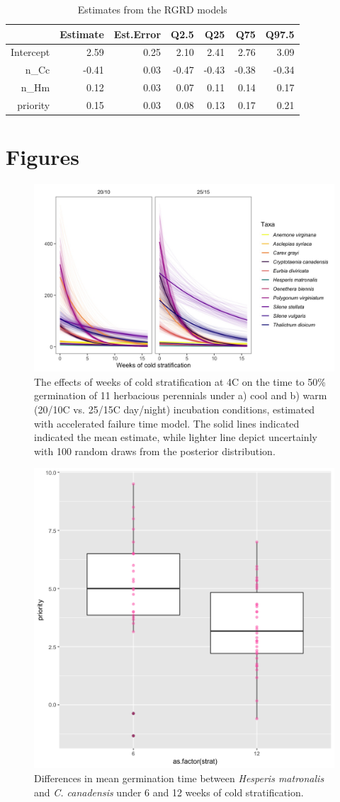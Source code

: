 \documentclass{article}\usepackage[]{graphicx}\usepackage[]{color}
\begin{document}
\begin{table}[ht]
\centering
\begin{tabular}{rrrrrrr}
  \hline
 & Estimate & Est.Error & Q2.5 & Q25 & Q75 & Q97.5 \\ 
  \hline
Intercept & 2.59 & 0.25 & 2.10 & 2.41 & 2.76 & 3.09 \\ 
  n\_Cc & -0.41 & 0.03 & -0.47 & -0.43 & -0.38 & -0.34 \\ 
  n\_Hm & 0.12 & 0.03 & 0.07 & 0.11 & 0.14 & 0.17 \\ 
  priority & 0.15 & 0.03 & 0.08 & 0.13 & 0.17 & 0.21 \\ 
   \hline
\end{tabular}
\caption{Estimates from the RGRD models}
\label{tab:RGRD}
\end{table}

\pagebreak


\section*{Figures}
\begin{figure}[h!]
    \centering
\includegraphics[width=\textwidth]{..//figure/AFTall.jpeg}
   \caption{The effects of weeks of cold stratification at 4\degree C on the time to 50\% germination of 11 herbacious perennials under a) cool and b) warm (20/10\degree C vs. 25/15\degree C day/night) incubation conditions, estimated with accelerated failure time model. The solid lines indicated indicated the mean estimate, while lighter line depict uncertainly with 100 random draws from the posterior distribution.} 
   \label{fig:AFTall}
\end{figure}


\begin{figure}[h!]
    \centering
\includegraphics[width=.5\textwidth]{..//figure/priority_treat.png}
   \caption{Differences in mean germination time between \textit{Hesperis matronalis} and \textit{C. canadensis} under 6 and 12 weeks of cold stratification.} 
   \label{fig:MGTsup}
\end{figure}
\end{document}
